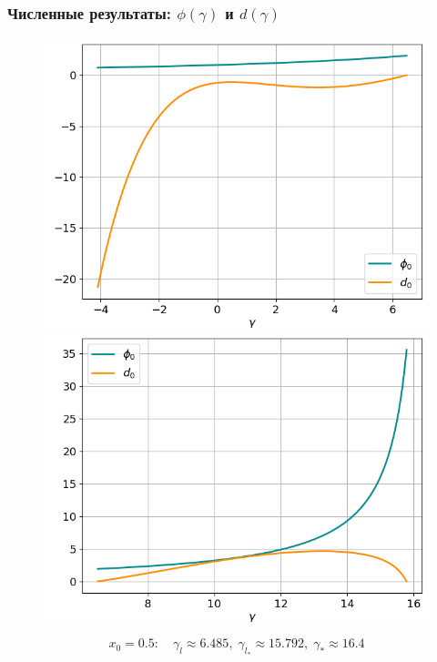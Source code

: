 \documentclass[fullscreen=true, unicode, bookmarks=false]{beamer}
\begin{document}
\begin{frame}
\frametitle{ Численные результаты: $ \phi(\gamma) $ и $ d(\gamma) $ }

\begin{figure} 
\includegraphics[scale=0.37]{divergent_phi0d0_12_1.png}  
\hfill
\includegraphics[scale=0.37]{divergent_phi0d0_12_2.png}  
\end{figure}

$$ x_0 = 0.5: \quad \gamma_l \approx 6.485, \; \gamma_{l_*} \approx 15.792, \; \gamma_* \approx 16.4 $$

\end{frame}
\end{document}
